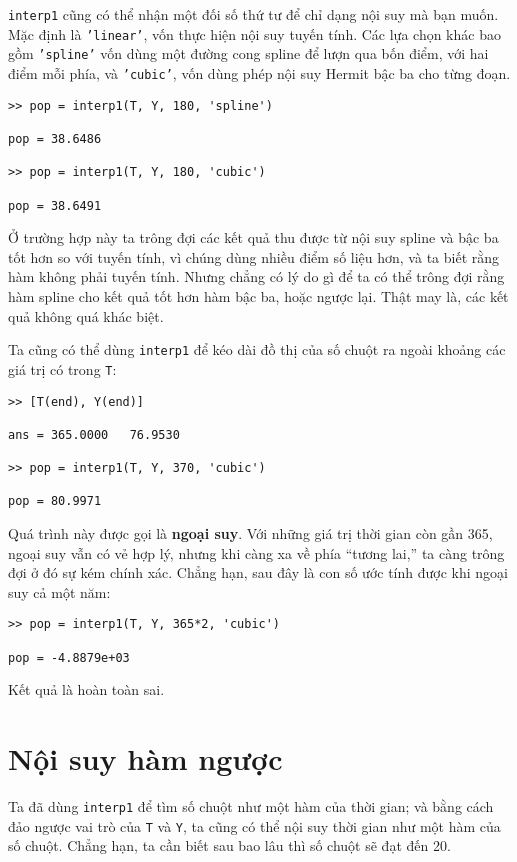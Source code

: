 \documentclass[12pt]{book}
\begin{document}
{\tt interp1} cũng có thể nhận một đối số thứ tư để chỉ dạng nội suy mà bạn muốn.
Mặc định là {\tt 'linear'}, vốn thực hiện nội suy tuyến tính. Các lựa chọn khác bao 
gồm {\tt 'spline'} vốn dùng một đường cong spline để lượn qua bốn điểm, với hai 
điểm mỗi phía, và {\tt 'cubic'}, vốn dùng phép nội suy Hermit bậc ba cho 
từng đoạn.

\begin{verbatim}
>> pop = interp1(T, Y, 180, 'spline')

pop = 38.6486

>> pop = interp1(T, Y, 180, 'cubic')

pop = 38.6491
\end{verbatim}
%
Ở trường hợp này ta trông đợi các kết quả thu được từ nội suy spline 
và bậc ba tốt hơn so với tuyến tính, vì chúng dùng nhiều điểm số liệu hơn, 
và ta biết rằng hàm không phải tuyến tính. Nhưng chẳng có lý do gì để ta 
có thể trông đợi rằng hàm spline cho kết quả tốt hơn hàm bậc ba, hoặc 
ngược lại. Thật may là, các kết quả không quá khác biệt. 

Ta cũng có thể dùng  {\tt interp1} để kéo dài đồ thị của số chuột ra 
ngoài khoảng các giá trị có trong {\tt T}:

\begin{verbatim}
>> [T(end), Y(end)]

ans = 365.0000   76.9530

>> pop = interp1(T, Y, 370, 'cubic')

pop = 80.9971
\end{verbatim}
%
Quá trình này được gọi là  {\bf ngoại suy}.  Với những giá trị thời gian 
còn gần 365, ngoại suy vẫn có vẻ hợp lý, nhưng khi càng xa về phía 
``tương lai,'' ta càng trông đợi ở đó sự kém chính xác. Chẳng hạn, 
sau đây là con số ước tính được khi ngoại suy cả một năm:

\begin{verbatim}
>> pop = interp1(T, Y, 365*2, 'cubic')

pop = -4.8879e+03
\end{verbatim}
%
Kết quả là hoàn toàn sai.


\section{Nội suy hàm ngược}

Ta đã dùng {\tt interp1} để tìm số chuột như một hàm của thời gian;
và bằng cách đảo ngược vai trò của {\tt T} và {\tt Y},  ta cũng có thể 
nội suy thời gian như một hàm của số chuột. Chẳng hạn, ta cần biết 
sau bao lâu thì số chuột sẽ đạt đến 20.
\end{document}
